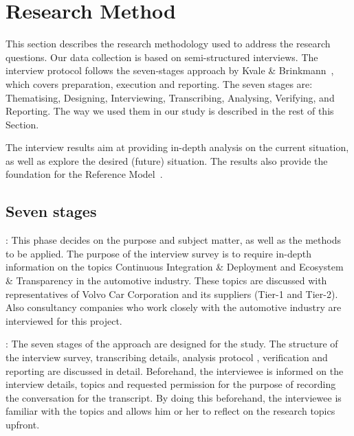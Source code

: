 \section{Research Method}\label{sec:researchMethod}

This section describes the research methodology used to address the research questions.
Our data collection is based on semi-structured interviews. 
The interview protocol follows the seven-stages approach by Kvale \& Brinkmann~\cite{Kvale2015Interviews}, which covers preparation, execution and reporting. The seven stages are: Thematising, Designing, Interviewing, Transcribing, Analysing, Verifying, and Reporting. The way we used them in our study is described in the rest of this Section. 

The interview results aim at providing in-depth analysis on the current situation, as well as explore the desired (future) situation. The results also provide the foundation for the Reference Model~\cite{Blessing:2009:DDR:1717807}. %

\subsection{Seven stages}

: This phase decides on the purpose and subject matter, as well as the methods to be applied. The purpose of the interview survey is to require in-depth information on the topics Continuous Integration \& Deployment and Ecosystem \& Transparency in the automotive industry. These topics are discussed with representatives of Volvo Car Corporation and its suppliers (Tier-1 and Tier-2). Also consultancy companies who work closely with the automotive industry are interviewed for this project.

: The seven stages of the approach are designed for the study. The structure of the interview survey, transcribing details, analysis protocol \cite{saldana2015coding}, verification and reporting are discussed in detail. Beforehand, the interviewee is informed on the interview details, topics and requested permission for the purpose of recording the conversation for the transcript. By doing this beforehand, the interviewee is familiar with the topics and allows him or her to reflect on the research topics upfront.

